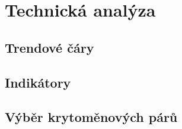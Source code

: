 \chapter{Technická analýza}
\label{sec:TechnicalAnalysis}

\section{Trendové čáry}
\label{sec:TrendingLines}

\section{Indikátory}
\label{sec:Indicators}

\section{Výběr krytoměnových párů}
\label{sec:ChoosingCryptopairs}

\endinput